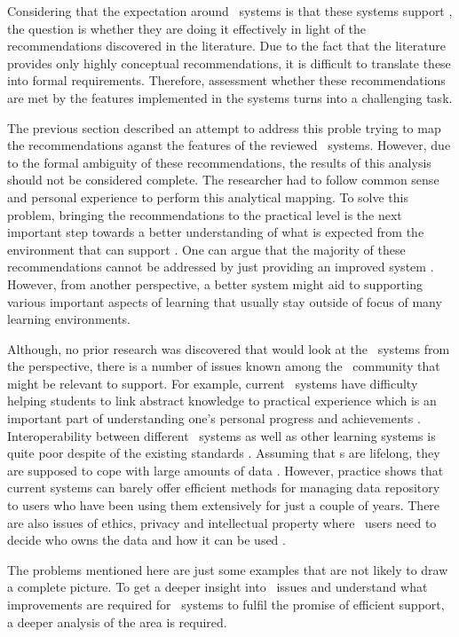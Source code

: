 Considering that the expectation around \ep~systems is that these systems
support \LLLsn, the question is whether they are doing it effectively in light
of the recommendations discovered in the literature. Due to the fact that the
literature provides only highly conceptual recommendations, it is difficult to
translate these into formal requirements. Therefore, assessment whether these
recommendations are met by the features implemented in the systems turns into a
challenging task. 

The previous section described an attempt to address this proble trying to map
the recommendations aganst the features of the reviewed \ep~systems. However,
due to the formal ambiguity of these recommendations, the results of this
analysis should not be considered complete. The researcher had to follow common
sense and personal experience to perform this analytical mapping. To solve this
problem, bringing the recommendations to the practical level is the next
important step towards a better understanding of what is expected from the
environment that can support \LLLsn. One can argue that the majority of these
recommendations cannot be addressed by just providing an improved system
\citep{Schaffert2008}. However, from another perspective, a better system might
aid to supporting various important aspects of learning that usually stay
outside of focus of many learning environments.

Although, no prior research was discovered that would look at the \ep~systems
from the \LLLs perspective, there is a number of issues known among the
\ep~community that might be relevant to \LLLs support. For example, current
\ep~systems have difficulty helping students to link abstract knowledge to
practical experience which is an important part of understanding one's personal
progress and achievements \citep{Chou2009}. Interoperability between different
\ep~systems as well as other learning systems is quite poor despite of the
existing standards \citep{Clark2011}. Assuming that \ep s are lifelong, they are
supposed to cope with large amounts of data \citep{Butler2010}. However,
practice shows that current systems can barely offer efficient methods for
managing data repository to users who have been using them extensively for just
a couple of years. There are also issues of ethics, privacy and intellectual
property where \ep~users need to decide who owns the data and how it can be used
\citep{Challis2005}.

The problems mentioned here are just some examples that are not likely to draw a
complete picture. To get a deeper insight into \ep~issues and understand what
improvements are required for \ep~systems to fulfil the promise of efficient
\LLLs support, a deeper analysis of the area is required.


